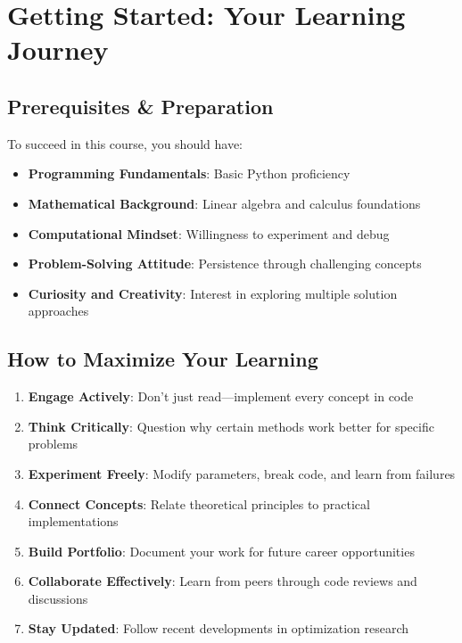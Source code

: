 \documentclass[
  letterpaper,
  DIV=11,
  numbers=noendperiod]{scrreprt}
\providecommand{\tightlist}{%
  \setlength{\itemsep}{0pt}\setlength{\parskip}{0pt}}
\begin{document}
\section{Getting Started: Your Learning
Journey}\label{getting-started-your-learning-journey}

\subsection{Prerequisites \&
Preparation}\label{prerequisites-preparation}

To succeed in this course, you should have:

\begin{itemize}
\tightlist
\item
  \textbf{Programming Fundamentals}: Basic Python proficiency
\item
  \textbf{Mathematical Background}: Linear algebra and calculus
  foundations\\
\item
  \textbf{Computational Mindset}: Willingness to experiment and debug
\item
  \textbf{Problem-Solving Attitude}: Persistence through challenging
  concepts
\item
  \textbf{Curiosity and Creativity}: Interest in exploring multiple
  solution approaches
\end{itemize}

\subsection{How to Maximize Your
Learning}\label{how-to-maximize-your-learning}

\begin{enumerate}
\def\labelenumi{\arabic{enumi}.}
\tightlist
\item
  \textbf{Engage Actively}: Don't just read---implement every concept in
  code
\item
  \textbf{Think Critically}: Question why certain methods work better
  for specific problems
\item
  \textbf{Experiment Freely}: Modify parameters, break code, and learn
  from failures
\item
  \textbf{Connect Concepts}: Relate theoretical principles to practical
  implementations
\item
  \textbf{Build Portfolio}: Document your work for future career
  opportunities
\item
  \textbf{Collaborate Effectively}: Learn from peers through code
  reviews and discussions
\item
  \textbf{Stay Updated}: Follow recent developments in optimization
  research
\end{enumerate}
\end{document}
